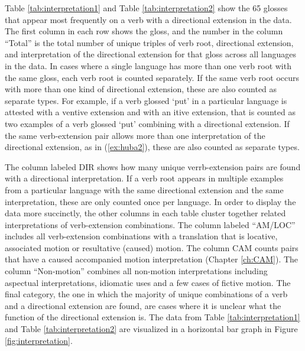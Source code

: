 Table \ref{tab:interpretation1} and Table \ref{tab:interpretation2} show the 65 glosses that appear most frequently on a verb with a directional extension in the data. The first column in each row shows the gloss, and the number in the column ``Total'' is the total number of unique triples of verb root, directional extension, and interpretation of the directional extension for that gloss across all languages in the data. In cases where a single language has more than one verb root with the same gloss, each verb root is counted separately. If the same verb root occurs with more than one kind of directional extension, these are also counted as separate types. For example, if a verb glossed `put' in a particular language is attested with a ventive extension and with an itive extension, that is counted as two examples of a verb glossed `put' combining with a directional extension. If the same verb-extension pair allows more than one interpretation of the directional extension, as in (\ref{ex:huba2}), these are also counted as separate types. 

The column labeled DIR shows how many unique verrb-extension pairs are found with a directional interpretation. If a verb root appears in multiple examples from a particular language with the same directional extension and the same interpretation, these are only counted once per language. In order to display the data more succinctly, the other columns in each table cluster together related interpretations of verb-extension combinations. The column labeled ``AM/LOC'' includes all verb-extension combinations with a translation that is locative, associated motion or resultative (caused) motion. The column CAM counts pairs that have a caused accompanied motion interpretation (Chapter \ref{ch:CAM}). The column ``Non-motion'' combines all non-motion interpretations including aspectual interpretations, idiomatic uses and a few cases of fictive motion. The final category, the one in which the majority of unique combinations of a verb and a directional extension are found, are cases where it is unclear what the function of the directional extension is. The data from Table \ref{tab:interpretation1} and Table \ref{tab:interpretation2} are visualized in a horizontal bar graph in Figure \ref{fig:interpretation}.

